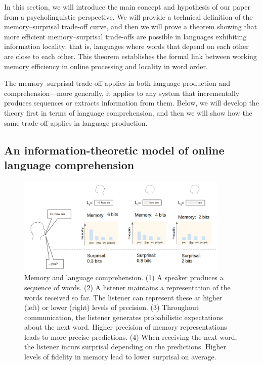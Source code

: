 In this section, we will introduce the main concept and hypothesis of our paper from a psycholinguistic perspective. We will provide a technical definition of the memory--surprisal trade-off curve, and then we will prove a theorem showing that more efficient memory--surprisal trade-offs are possible in languages exhibiting information locality: that is, languages where words that depend on each other are close to each other. This theorem establishes the formal link between working memory efficiency in online processing and locality in word order.

The memory--surprisal trade-off applies in both language production and comprehension---more generally, it applies to any system that incrementally produces sequences or extracts information from them. Below, we will develop the theory first in terms of language comprehension, and then we will show how the same trade-off applies in language production.

\subsection{An information-theoretic model of online language comprehension}

\begin{figure}
\centering
\includegraphics[width=0.9\textwidth]{figures-gdrive/communication.png}
	\caption{Memory and language comprehension. (1) A speaker produces a sequence of words. (2) A listener maintains a representation of the words received so far. The listener can represent these at higher (left) or lower (right) levels of precision. (3) Throughout communication, the listener generates probabilistic expectations about the next word. Higher precision of memory representations leads to more precise predictions. (4) When receiving the next word, the listener incurs surprisal depending on the predictions. Higher levels of fidelity in memory lead to lower surprisal on average.  }
	\label{fig:communication}
\end{figure}

